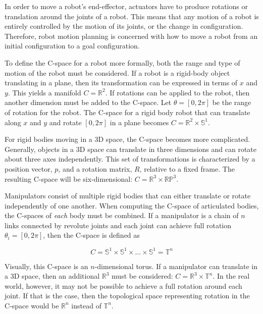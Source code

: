 \documentclass[10pt,conference]{ieeeconf}
\begin{document}
In order to move a robot's end-effector, actuators have to produce rotations or translation around the joints of a robot. This means that any motion of a robot is entirely controlled by the motion of its joints, or the change in configuration. Therefore, robot motion planning is concerned with how to move a robot from an initial configuration to a goal configuration.
    
    To define the C-space for a robot more formally, both the range and type of motion of the robot must be considered. If a robot is a rigid-body object translating in a plane, then its transformation can be expressed in terms of $x$ and $y$. This yields a manifold $C=\mathbb{R}^2$. If rotations can be applied to the robot, then another dimension must be added to the C-space. Let $\theta=[0, 2\pi]$ be the range of rotation for the robot. The C-space for a rigid body robot that can translate along $x$ and $y$ and rotate $[0, 2\pi]$ in a plane becomes $C=\mathbb{R}^2 \times \mathbb{S}^1$.
    
    For rigid bodies moving in a 3D space, the C-space becomes more complicated. Generally, objects in a 3D space can translate in three dimensions and can rotate about three axes independently. This set of transformations is characterized by a position vector, $p$, and a rotation matrix, $R$, relative to a fixed frame. The resulting C-space will be six-dimensional: $C=\mathbb{R}^3 \times \mathbb{R}\mathbb{P}^3$. 
    
    Manipulators consist of multiple rigid bodies that can either translate or rotate independently of one another. When computing the C-space of articulated bodies, the C-spaces of \emph{each} body must be combined. If a manipulator is a chain of $n$ links connected by revolute joints and each joint can achieve full rotation $\theta_i=[0, 2\pi]$, then the C-space is defined as
    
    \begin{equation}
    C = \mathbb{S}^1 \times \mathbb{S}^1 \times ... \times \mathbb{S}^1 = \mathbb{T}^n
    \end{equation}
   
    Visually, this C-space is an $n$-dimensional torus. If a manipulator can translate in a 3D space, then an additional $\mathbb{R}^3$ must be considered: $C=\mathbb{R}^3 \times \mathbb{T}^n$. In the real world, however, it may not be possible to achieve a full rotation around each joint. If that is the case, then the topological space representing rotation in the C-space would be $\mathbb{R}^n$ instead of $\mathbb{T}^n$. 
    
\end{document}

